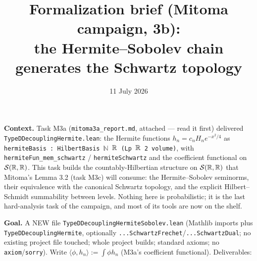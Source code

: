 \documentclass[11pt]{article}
\title{Formalization brief (Mitoma campaign, 3b):\\
the Hermite--Sobolev chain generates the Schwartz topology}
\date{11 July 2026}
\theoremstyle{plain}
\theoremstyle{remark}
\newcommand{\ip}[2]{\langle #1,#2\rangle}
\begin{document}
\maketitle

\noindent\textbf{Context.} Task M3a (\texttt{mitoma3a\_report.md},
attached --- read it first) delivered
\texttt{TypeDDecouplingHermite.lean}: the Hermite functions
$h_n=c_nH_ne^{-x^2/4}$ as \texttt{hermiteBasis : HilbertBasis
$\mathbb N$ $\mathbb{R}$ (Lp $\mathbb{R}$ 2 volume)}, with \texttt{hermiteFun\_mem\_schwartz}
/ \texttt{hermiteSchwartz} and the coefficient functional on
$\mathcal{S}(\mathbb{R},\mathbb{R})$. This task builds the countably-Hilbertian structure on
$\mathcal{S}(\mathbb{R},\mathbb{R})$ that Mitoma's Lemma 3.2 (task M3c) will consume: the
Hermite--Sobolev seminorms, their equivalence with the canonical Schwartz
topology, and the explicit Hilbert--Schmidt summability between levels.
Nothing here is probabilistic; it is the last hard-analysis task of the
campaign, and most of its tools are now on the shelf.

\medskip
\noindent\textbf{Goal.} A NEW file
\texttt{TypeDDecouplingHermiteSobolev.lean} (Mathlib imports plus
\texttt{TypeDDecouplingHermite}, optionally
\texttt{...SchwartzFrechet}/\texttt{...SchwartzDual}; no existing project
file touched; whole project builds; standard axioms; no
\texttt{axiom}/\texttt{sorry}). Write $\ip{\phi}{h_n}:=\int\phi h_n$
(M3a's coefficient functional). Deliverables:
\end{document}
